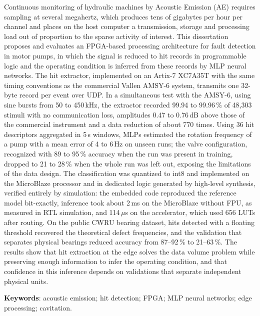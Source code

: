 \documentclass[
	12pt,				%
	oneside,
	a4paper,			%
	english,			%
	french,				%
	spanish,			%
	brazil				%
	]{abntex2}
\begin{document}
\begin{resumo}[Abstract]
Continuous monitoring of hydraulic machines by Acoustic Emission (AE) requires sampling at several megahertz, which produces tens of gigabytes per hour per channel and places on the host computer a transmission, storage and processing load out of proportion to the sparse activity of interest. This dissertation proposes and evaluates an FPGA-based processing architecture for fault detection in motor pumps, in which the signal is reduced to hit records in programmable logic and the operating condition is inferred from these records by MLP neural networks. The hit extractor, implemented on an Artix-7 XC7A35T with the same timing conventions as the commercial Vallen AMSY-6 system, transmits one 32-byte record per event over UDP. In a simultaneous test with the AMSY-6, using sine bursts from 50 to 450\,kHz, the extractor recorded 99.94 to 99.96\,\% of 48,303 stimuli with no communication loss, amplitudes 0.47 to 0.76\,dB above those of the commercial instrument and a data reduction of about 770 times. Using 36 hit descriptors aggregated in 5\,s windows, MLPs estimated the rotation frequency of a pump with a mean error of 4 to 6\,Hz on unseen runs; the valve configuration, recognized with 89 to 95\,\% accuracy when the run was present in training, dropped to 21 to 28\,\% when the whole run was left out, exposing the limitations of the data design. The classification was quantized to int8 and implemented on the MicroBlaze processor and in dedicated logic generated by high-level synthesis, verified entirely by simulation: the embedded code reproduced the reference model bit-exactly, inference took about 2\,ms on the MicroBlaze without FPU, as measured in RTL simulation, and 114\,\(\mu\)s on the accelerator, which used 656 LUTs after routing. On the public CWRU bearing dataset, hits detected with a floating threshold recovered the theoretical defect frequencies, and the validation that separates physical bearings reduced accuracy from 87--92\,\% to 21--63\,\%. The results show that hit extraction at the edge solves the data volume problem while preserving enough information to infer the operating condition, and that confidence in this inference depends on validations that separate independent physical units.

\textbf{Keywords}: acoustic emission; hit detection; FPGA; MLP neural networks; edge processing; cavitation.
\end{resumo}
\end{document}
